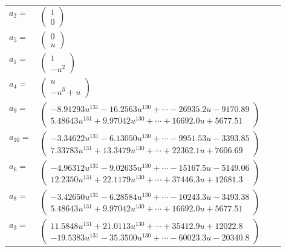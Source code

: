 \documentclass[1p]{elsarticle_modified}
\theoremstyle{definition}
\begin{document}
\begin{tabular}{m{7pt} m{180pt} m{7pt} m{180pt} }
\flushright $a_{2}=$&$\begin{pmatrix}1\\0\end{pmatrix}$ \\
\flushright $a_{5}=$&$\begin{pmatrix}0\\u\end{pmatrix}$ \\
\flushright $a_{1}=$&$\begin{pmatrix}1\\- u^2\end{pmatrix}$ \\
\flushright $a_{4}=$&$\begin{pmatrix}u\\- u^3+u\end{pmatrix}$ \\
\flushright $a_{9}=$&$\begin{pmatrix}-8.91293 u^{131}-16.2563 u^{130}+\cdots-26935.2 u-9170.89\\5.48643 u^{131}+9.97042 u^{130}+\cdots+16692.0 u+5677.51\end{pmatrix}$ \\
\flushright $a_{10}=$&$\begin{pmatrix}-3.34622 u^{131}-6.13050 u^{130}+\cdots-9951.53 u-3393.85\\7.33783 u^{131}+13.3479 u^{130}+\cdots+22362.1 u+7606.69\end{pmatrix}$ \\
\flushright $a_{6}=$&$\begin{pmatrix}-4.96312 u^{131}-9.02635 u^{130}+\cdots-15167.5 u-5149.06\\12.2350 u^{131}+22.1179 u^{130}+\cdots+37446.3 u+12681.3\end{pmatrix}$ \\
\flushright $a_{8}=$&$\begin{pmatrix}-3.42650 u^{131}-6.28584 u^{130}+\cdots-10243.3 u-3493.38\\5.48643 u^{131}+9.97042 u^{130}+\cdots+16692.0 u+5677.51\end{pmatrix}$ \\
\flushright $a_{3}=$&$\begin{pmatrix}11.5848 u^{131}+21.0113 u^{130}+\cdots+35412.9 u+12022.8\\-19.5383 u^{131}-35.3500 u^{130}+\cdots-60023.3 u-20340.8\end{pmatrix}$ \\

\end{tabular}
\end{document}
